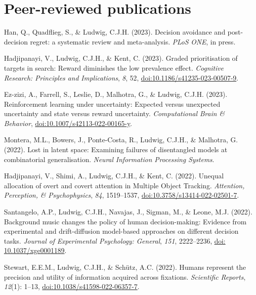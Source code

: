 \documentclass[a4paper, 10pt]{article}
\renewenvironment{itemize}{
  \begin{list}{}{
    \setlength{\leftmargin}{1.5em}
  }
}{
  \end{list}
}
\begin{document}
\section*{Peer-reviewed publications}

\begin{itemize}
\item Han, Q., Quadflieg, S., \& Ludwig, C.J.H. (2023). Decision avoidance and post-decision regret: a systematic review and meta-analysis. \textit{PLoS ONE}, in press.
\item Hadjipanayi, V., Ludwig, C.J.H., \& Kent, C. (2023). Graded prioritisation of targets in search: Reward diminishes the low prevalence effect. \textit{Cognitive Research: Principles and Implications}, \textit{8}, 52, \href{https://doi.org/10.1186/s41235-023-00507-9}{doi:10.1186/s41235-023-00507-9}.
\item Ez-zizi, A., Farrell, S., Leslie, D., Malhotra, G., \& Ludwig, C.J.H. (2023). Reinforcement learning under uncertainty: Expected versus unexpected uncertainty and state versus reward uncertainty. \textit{Computational Brain \& Behavior}, \href{https://doi.org/10.1007/s42113-022-00165-y}{doi:10.1007/s42113-022-00165-y}.
\item Montera, M.L., Bowers, J., Ponte-Costa, R., Ludwig, C.J.H., \& Malhotra, G. (2022). Lost in latent space: Examining failures of disentangled models at combinatorial generalisation. \textit{Neural Information Processing Systems}.
\item Hadjipanayi, V., Shimi, A., Ludwig, C.J.H., \& Kent, C. (2022). Unequal allocation of overt and covert attention in Multiple Object Tracking. \textit{Attention, Perception, \& Psychophysics}, \textit{84}, 1519--1537, \href{https://doi.org/10.3758/s13414-022-02501-7}{doi:10.3758/s13414-022-02501-7}.
\item Santangelo, A.P., Ludwig, C.J.H., Navajas, J., Sigman, M., \& Leone, M.J. (2022). Background music changes the policy of human decision-making: Evidence from experimental and drift-diffusion model-based approaches on different decision tasks. \textit{Journal of Experimental Psychology: General}, \textit{151}, 2222--2236, \href{https://doi.apa.org/doi/10.1037/xge0001189}{doi: 10.1037/xge0001189}.
\item Stewart, E.E.M., Ludwig, C.J.H., \& Sch\"{u}tz, A.C. (2022). Humans represent the precision and utility of information acquired across fixations. \textit{Scientific Reports}, \textit{12}(1): 1--13, \href{https://doi.org/10.1038/s41598-022-06357-7}{doi:10.1038/s41598-022-06357-7}.

\end{itemize}
\end{document}
